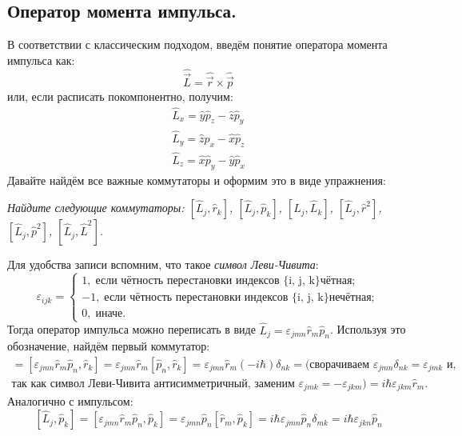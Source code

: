 \subsection{Оператор момента импульса.}
В соответствии с классическим подходом, введём понятие оператора момента импульса как:
\[
\hat{\Vec{L}} = \hat{\Vec{r}} \times \hat{\Vec{p}}
\]
или, если расписать покомпонентно, получим:
\begin{equation*}
\begin{split}
    \hat{L}_x = \hat{y}\hat{p}_z - \hat{z}\hat{p}_y\\
    \hat{L}_y = \hat{z}\hat{p}_x - \hat{x}\hat{p}_z\\
    \hat{L}_z = \hat{x}\hat{p}_y - \hat{y}\hat{p}_x
\end{split}
\end{equation*}
Давайте найдём все важные коммутаторы и оформим это в виде упражнения:
\begin{center}
    \textit{Найдите следующие коммутаторы: $[\hat{L}_j, \hat{r}_k]$, $[\hat{L}_j, \hat{p}_k]$, $[\hat{L}_j, \hat{L}_k]$, $[\hat{L}_j, \hat{r}^2]$, $[\hat{L}_j, \hat{p}^2]$, $[\hat{L}_j, \hat{L}^2]$.}
\end{center}
Для удобства записи вспомним, что такое \textit{символ Леви-Чивита}:
\[
\varepsilon_{ijk} = 
\begin{cases}
    1,\; \text{если чётность перестановки индексов \{i, j, k\} чётная};\\
    -1,\;\text{если чётность перестановки индексов \{i, j, k\} нечётная}; \\
    0,\;\text{иначе}.
\end{cases}
\]
Тогда оператор импульса можно переписать в виде $\hat{L}_j = \varepsilon_{jmn} \hat{r}_m \hat{p}_n$. Используя это обозначение, найдём первый коммутатор:
\begin{multline*}
    [\hat{L}_j, \hat{r}_k] = [\varepsilon_{jmn} \hat{r}_m \hat{p}_n, \hat{r}_k] = \varepsilon_{jmn} \hat{r}_m [\hat{p}_n, \hat{r}_k] = \varepsilon_{jmn}\hat{r}_m(-i\hbar)\delta_{nk} = (\text{сворачиваем } \varepsilon_{jmn}\delta_{nk} = \varepsilon_{jmk} \text{ и,} \\ \text{так как символ Леви-Чивита антисимметричный, заменим } \varepsilon_{jmk} = -\varepsilon_{jkm}) = i\hbar\varepsilon_{jkm}\hat{r}_m.
\end{multline*}
Аналогично с импульсом:
\[
[\hat{L}_j, \hat{p}_k] = [\varepsilon_{jmn} \hat{r}_m \hat{p}_n, \hat{p}_k] = \varepsilon_{jmn} \hat{p}_n [\hat{r}_m, \hat{p}_k] = i\hbar\varepsilon_{jmn}\hat{p}_n\delta_{mk} = i\hbar\varepsilon_{jkn}\hat{p}_n
\]
